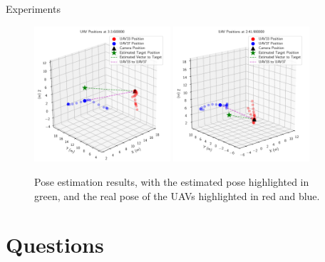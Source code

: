 \documentclass{beamer}
\begin{document}
\begin{frame}{Experiments}

\begin{figure}[H]
	\centering
	  \includegraphics[width=0.45\textwidth]{../fig/pgfplot/build/3dplot3.pdf}
	  \includegraphics[width=0.45\textwidth]{../fig/pgfplot/build/3dplot1.pdf}
	\caption{
           Pose estimation results, with the estimated pose highlighted in green, and the real pose of the UAVs highlighted in red and blue.
        }
	\label{fig:poseresults}
\end{figure}

\end{frame}


    

\section{Questions}
\end{document}
